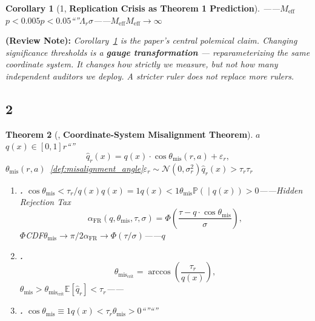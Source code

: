 \documentclass[12pt,a4paper]{article}
\newtheorem{theorem}{Theorem}[section]
\newtheorem{corollary}[theorem]{Corollary}
\theoremstyle{remark}
\newcommand{\E}{\mathbb{E}}
\newcommand{\Pbb}{\mathbb{P}}
\newcommand{\misalignAngle}{\theta_{\text{mis}}}
\newcommand{\falseRejRate}{\alpha_{\text{FR}}}
\newcommand{\reviewnote}[1]{%
    \medskip\noindent
    \textbf{ (Review Note):} \textit{#1}%
}
\begin{document}
\begin{corollary}[1, \textbf{Replication Crisis as Theorem 1 Prediction}]
\label{cor:replication_crisis}
——$M_{\text{eff}}$\textbf{}$p < 0.005$$p < 0.05$``''$\Lambda_r$$\sigma$——$M_{\text{eff}}$$M_{\text{eff}} \to \infty$
\end{corollary}

\reviewnote{Corollary~\ref{cor:replication_crisis} is the paper's central polemical claim. Changing significance thresholds is a \textbf{gauge transformation} — reparameterizing the same coordinate system. It changes how strictly we measure, but not how many independent auditors we deploy. A stricter ruler does not replace more rulers.}

\subsection{2}

\begin{theorem}[, \textbf{Coordinate-System Misalignment Theorem}]
\label{thm:misalignment}
$a$$q(x) \in [0,1]$$r$``''
\begin{equation}
    \hat{q}_r(x) = q(x) \cdot \cos\misalignAngle(r, a) + \varepsilon_r,
    \label{eq:observed_quality}
\end{equation}
$\misalignAngle(r, a)$~\ref{def:misalignment_angle}$\varepsilon_r \sim \mathcal{N}(0, \sigma_r^2)$$\hat{q}_r(x) > \tau_r$$\tau_r$


\begin{enumerate}[label=(\roman*)]
    \item \textbf{.} $\cos\misalignAngle < \tau_r / q(x)$$q(x) = 1$$q(x) < 1$$\misalignAngle$$\Pbb(\text{} \mid q(x)) > 0$——\textbf{}Hidden Rejection Tax
    \begin{equation}
        \falseRejRate(q, \misalignAngle, \tau, \sigma) = \Phi\left(\frac{\tau - q \cdot \cos\misalignAngle}{\sigma}\right),
        \label{eq:false_rejection_tax}
    \end{equation}
    $\Phi$CDF$\misalignAngle \to \pi/2$$\falseRejRate \to \Phi(\tau/\sigma)$——$q$
    
    \item \textbf{.} 
    \begin{equation}
        \misalignAngle_{\text{crit}} = \arccos\left(\frac{\tau_r}{q(x)}\right),
        \label{eq:critical_angle}
    \end{equation}
    $\misalignAngle > \misalignAngle_{\text{crit}}$$\E[\hat{q}_r] < \tau_r$——\textbf{}
    
    \item \textbf{.} $\cos\misalignAngle \equiv 1$$q(x) < \tau_r$$\misalignAngle > 0$``''``''
\end{enumerate}
\end{theorem}
\end{document}
